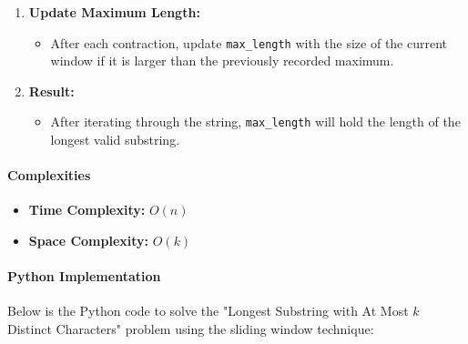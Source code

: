 \begin{enumerate}
    \item \textbf{Update Maximum Length:}
    \begin{itemize}
        \item After each contraction, update \texttt{max\_length} with the size of the current window if it is larger than the previously recorded maximum.
    \end{itemize}
    
    \item \textbf{Result:}
    \begin{itemize}
        \item After iterating through the string, \texttt{max\_length} will hold the length of the longest valid substring.
    \end{itemize}
\end{enumerate}

\paragraph*{Complexities}

\begin{itemize}
    \item \textbf{Time Complexity:} \(O(n)\)
    \item \textbf{Space Complexity:} \(O(k)\)
\end{itemize}

\paragraph*{Python Implementation}

Below is the Python code to solve the "Longest Substring with At Most \(k\) Distinct Characters" problem using the sliding window technique:

